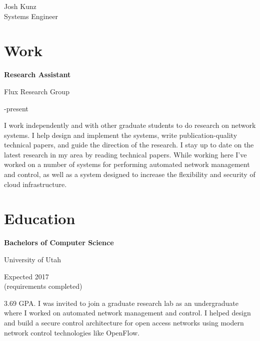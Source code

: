 \documentclass[10pt]{article}
\newcommand{\triline}[3]{%
    \parbox[t][][t]{.4\linewidth}{ #1 }%
    \parbox[t][][t]{.4\linewidth}{ #2 }%
    \parbox[t][][t]{.2\linewidth}{\raggedleft #3 }%
    \vspace{1ex}
}
\begin{document}
\titlespacing*{\section}{0pt}{1ex}{2ex}

\begin{center}
{ \fontsize{0.6in}{0in}\selectfont Josh Kunz } \\
\vspace{1ex}
{\large Systems Engineer } \\
\vspace{1ex}
\end{center}

\section{Work}

\triline{\bf Research Assistant}{Flux Research Group}{2014-present}

I work independently and with other graduate students to do research on network
systems. I help design and implement the systems, write publication-quality
technical papers, and guide the direction of the research. I stay up
to date on the latest research in my area by reading technical papers.
While working here I've worked on a number of systems for performing automated
network management and control, as well as a system designed to increase the 
flexibility and security of cloud infrastructure.

\section{Education}

\triline{\bf Bachelors of Computer Science}%
{University of Utah}%
{Expected 2017 \\ \scriptsize (requirements completed) }

3.69 GPA. I was invited to join a graduate research lab as an undergraduate
where I worked on automated network management and control. I helped design
and build a secure control architecture for open access networks using modern
network control technologies like OpenFlow.
\end{document}
